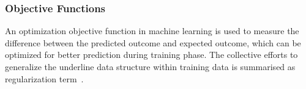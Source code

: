 \subsubsection{Objective Functions}
An optimization objective function in machine learning is used to measure the difference between the predicted outcome and expected outcome, which can be optimized for better prediction during training phase.  The collective efforts to generalize the underline data structure within training data is summarised as regularization term~\cite{goodfellow_2015}.  
